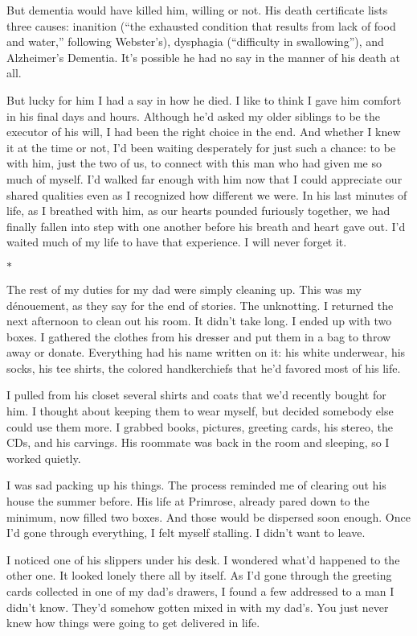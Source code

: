 \documentclass[12pt]{book}
\begin{document}
But dementia would have killed him, willing or not. His death certificate lists three causes: inanition (``the exhausted condition that results from lack of food and water,'' following Webster's), dysphagia (``difficulty in swallowing''), and Alzheimer's Dementia. It's possible he had no say in the manner of his death at all.

But lucky for him I had a say in how he died. I like to think I gave him comfort in his final days and hours. Although he'd asked my older siblings to be the executor of his will, I had been the right choice in the end. And whether I knew it at the time or not, I'd been waiting desperately for just such a chance: to be with him, just the two of us, to connect with this man who had given me so much of myself. I'd walked far enough with him now that I could appreciate our shared qualities even as I recognized how different we were. In his last minutes of life, as I breathed with him, as our hearts pounded furiously together, we had finally fallen into step with one another before his breath and heart gave out. I'd waited much of my life to have that experience. I will never forget it.

\begin{center}$*$\end{center}

The rest of my duties for my dad were simply cleaning up. This was my d\'enouement, as they say for the end of stories. The unknotting. I returned the next afternoon to clean out his room. It didn't take long. I ended up with two boxes. I gathered the clothes from his dresser and put them in a bag to throw away or donate. Everything had his name written on it: his white underwear, his socks, his tee shirts, the colored handkerchiefs that he'd favored most of his life.

I pulled from his closet several shirts and coats that we'd recently bought for him. I thought about keeping them to wear myself, but decided somebody else could use them more. I grabbed books, pictures, greeting cards, his stereo, the CDs, and his carvings. His roommate was back in the room and sleeping, so I worked quietly.

I was sad packing up his things. The process reminded me of clearing out his house the summer before. His life at Primrose, already pared down to the minimum, now filled two boxes. And those would be dispersed soon enough. Once I'd gone through everything, I felt myself stalling. I didn't want to leave.

I noticed one of his slippers under his desk. I wondered what'd happened to the other one. It looked lonely there all by itself. As I'd gone through the greeting cards collected in one of my dad's drawers, I found a few addressed to a man I didn't know. They'd somehow gotten mixed in with my dad's. You just never knew how things were going to get delivered in life.
\end{document}
